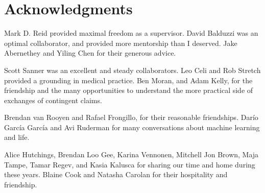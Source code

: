 \chapter*{Acknowledgments}

Mark D. Reid provided maximal freedom as a supervisor.
David Balduzzi was an optimal collaborator, and provided more mentorship than I deserved.
Jake Abernethey and Yiling Chen for their generous advice.

Scott Sanner was an excellent and steady collaborators.
Leo Celi and Rob Stretch provided a grounding in medical practice. 
Ben Moran, and Adam Kelly, for the friendship and the many opportunities to understand the more practical side of exchanges of contingent claims.

Brendan van Rooyen and Rafael Frongillo, for their reasonable friendships. 
Dar\'io Garc\'ia Garc\'ia and Avi Ruderman for many conversations about machine learning and life.

Alice Hutchings, Brendan Loo Gee, Karina Vennonen, Mitchell Jon Brown, Maja Tampe, Tamar Regev, and Kasia Kalusca for sharing our time and home during these years.
Blaine Cook and Natasha Carolan for their hospitality and friendship.

